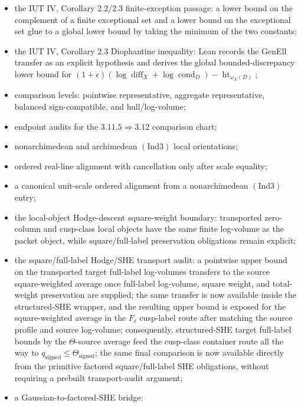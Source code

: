 \documentclass[11pt]{article}
\begin{document}
\begin{itemize}
  \((1+\epsilon_E)(\log\operatorname{diff}_X+\log\operatorname{cond}_D)
   -\operatorname{ht}_{\omega_X(D)}\);
\item the IUT IV, Corollary 2.2/2.3 finite-exception passage:
  a lower bound on the complement of a finite exceptional set and a lower bound
  on the exceptional set glue to a global lower bound by taking the minimum of
  the two constants;
\item the IUT IV, Corollary 2.3 Diophantine inequality:
  Lean records the GenEll transfer as an explicit hypothesis and derives the
  global bounded-discrepancy lower bound for
  \((1+\epsilon)(\log\operatorname{diff}_X+\log\operatorname{cond}_D)
   -\operatorname{ht}_{\omega_X(D)}\);
\item comparison levels:
  pointwise representative, aggregate representative, balanced sign-compatible,
  and hull/log-volume;
\item endpoint audits for the \(3.11.5 \Rightarrow 3.12\) comparison chart;
\item nonarchimedean and archimedean \((\mathrm{Ind3})\) local orientations;
\item ordered real-line alignment with cancellation only after scale equality;
\item a canonical unit-scale ordered alignment from a nonarchimedean
  \((\mathrm{Ind3})\) entry;
\item the local-object Hodge-descent square-weight boundary:
  transported zero-column and cusp-class local objects have the same finite
  log-volume as the packet object, while square/full-label preservation
  obligations remain explicit;
\item the square/full-label Hodge/SHE transport audit:
  a pointwise upper bound on the transported target full-label log-volumes
  transfers to the source square-weighted average once full-label log-volume,
  square weight, and total-weight preservation are supplied; the same transfer
  is now available inside the structured-SHE wrapper, and the resulting upper
  bound is exposed for the square-weighted average in the \(F_\ell\) cusp-label
  route after matching the source profile and source log-volume; consequently,
  structured-SHE target full-label bounds by the \(\Theta\)-source average feed
  the cusp-class container route all the way to
  \(q_{\mathrm{signed}}\le\Theta_{\mathrm{signed}}\); the same final comparison
  is now available directly from the primitive factored square/full-label SHE
  obligations, without requiring a prebuilt transport-audit argument;
\item a Gaussian-to-factored-SHE bridge:

\end{itemize}
\end{document}
